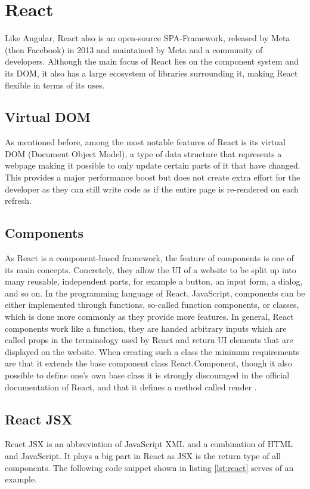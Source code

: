 \section{React}
Like Angular, React also is an open-source SPA-Framework, released by Meta (then Facebook) in 2013 and maintained by
Meta and a community of developers. Although the main focus of React lies on the component system and its DOM, it also 
has a large ecosystem of libraries surrounding it, making React flexible in terms of its uses.

\subsection{Virtual DOM}
As mentioned before, among the most notable features of React is its virtual DOM (Document Object Model), a type of 
data structure that represents a webpage making it possible to only update certain parts of it that have changed. 
This provides a major performance boost but does not create extra effort for the developer as they can still write 
code as if the entire page is re-rendered on each refresh.

\subsection{Components}
As React is a component-based framework, the feature of components is one of its main concepts. Concretely, they
allow the UI of a website to be split up into many reusable, independent parts,
for example a button, an input form, a dialog, and so on. In the programming language of React, JavaScript,
components can be either implemented through functions, so-called function components, or classes, which is done 
more commonly as they provide more features. In general, React components work like a function, they are handed 
arbitrary inputs which are called props in the terminology used by React
and return UI elements that are displayed on the website. When creating 
such a class the minimum requirements are that it extends the base component class React.Component, though it 
also possible to define one's own base class it is strongly discouraged in the official documentation of React,
and that it defines a method called render \cite{ReactComponentProps} \cite{ReactComponent}.
\\
\subsection{React JSX}
React JSX is an abbreviation of JavaScript XML and a combination
of HTML and JavaScript. It plays a big part in React as JSX is the return type of all components. The following 
code snippet shown in listing \ref{lst:react} serves of an example.


